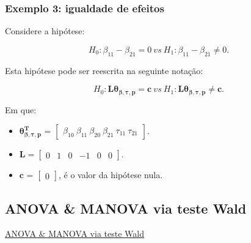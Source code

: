 \documentclass[10pt,
  aspectratio=169,
  serif,
  mathserif,
  professionalfont,
  compress,
  handout,
  ]{beamer}\usepackage[]{graphicx}\usepackage[]{color}
\begin{document}

\begin{frame}

\frametitle{Exemplo 3: igualdade de efeitos}

Considere a hipótese:

$$H_0: \beta_{11} - \beta_{21} = 0 \ vs \ H_1: \beta_{11} - \beta_{21} \neq 0.$$

Esta hipótese pode ser reescrita na seguinte notação:

$$H_0: \boldsymbol{L}\boldsymbol{\theta_{\beta,\tau,p}} = \boldsymbol{c} \ vs \ H_1: \boldsymbol{L}\boldsymbol{\theta_{\beta,\tau,p}} \neq \boldsymbol{c}.$$ 

Em que:

\begin{itemize}
  
  \item $\boldsymbol{\theta_{\beta,\tau,p}^T}$ = $\begin{bmatrix} \beta_{10} \  \beta_{11} \ \beta_{20} \ \beta_{21} \ \tau_{11} \ \tau_{21} \end{bmatrix}$.


\item $\boldsymbol{L} = \begin{bmatrix} 0 & 1 & 0 & -1 & 0 & 0  \end{bmatrix}.$
 
\item $\boldsymbol{c}$ = $\begin{bmatrix} 0 \end{bmatrix}$, é o valor da hipótese nula. 

\end{itemize}

\end{frame}


\subsection{ANOVA \& MANOVA via teste Wald}


\begin{frame}[c, allowframebreaks]

\begin{center}

  {\normalsize \href{https://lineu96.github.io/st/}{ANOVA \& MANOVA via teste Wald}}
  
\end{center}

\end{frame}
\end{document}

